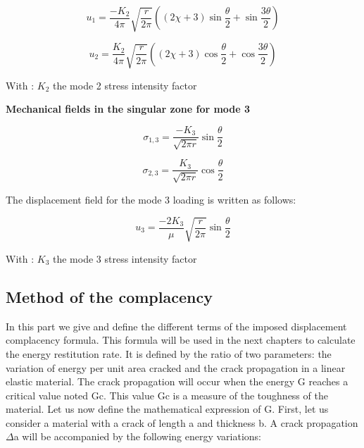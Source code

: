 \begin{equation}
	u_{1} = \frac{-K_{2}}{4 \pi} \sqrt{\frac{r}{2 \pi}} \left((2 \chi+3) \sin{\frac{\theta}{2}}+\sin{\frac{3 \theta}{2}}\right)
\end{equation}

\begin{equation}
	u_{2} = \frac{K_{2}}{4 \pi} \sqrt{\frac{r}{2 \pi}} \left((2 \chi+3) \cos{\frac{\theta}{2}}+\cos{\frac{3 \theta}{2}}\right)
\end{equation}

With : $K_2$  the mode 2 stress intensity factor

\smallskip

\textbf{Mechanical fields in the singular zone for mode 3}

\begin{equation}
	\sigma_{1,3} = \frac{-K_{3}}{\sqrt{2 \pi r}} \sin{\frac{\theta}{2}}
\end{equation}

\begin{equation}
	\sigma_{2,3} = \frac{K_{3}}{\sqrt{2 \pi r}} \cos{\frac{\theta}{2}}
\end{equation}

The displacement field for the mode 3 loading is written as follows:

\begin{equation}
	u_{3} = \frac{-2 K_{3}}{\mu} \sqrt{\frac{r}{2 \pi}} \sin{\frac{\theta}{2}}
\end{equation}

With : $K_3$  the mode 3 stress intensity factor

\subsection{Method of the complacency}

In this part we give and define the different terms of the imposed displacement complacency formula. This formula will be used in the next chapters to calculate the energy restitution rate. It is defined by the ratio of two parameters: the variation of energy per unit area cracked and the crack propagation in a linear elastic material. The crack propagation will occur when the energy G reaches a critical value noted Gc. This value Gc is a measure of the toughness of the material. Let us now define the mathematical expression of G. First, let us consider a material with a crack of length a and thickness b. A crack propagation $\Delta$a will be accompanied by the following energy variations:

